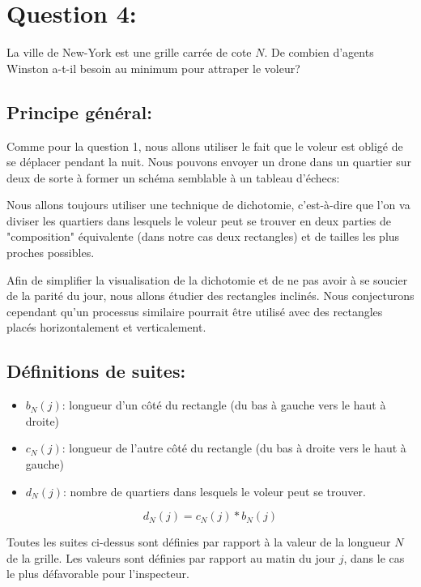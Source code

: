 \section{Question 4:}
\begin{enonce}
La ville de New-York est une grille carrée de cote $N$. De combien d'agents Winston a-t-il besoin au minimum pour attraper le voleur?
\end{enonce}
\subsection{Principe général:}
Comme pour la question 1, nous allons utiliser le fait que le voleur est obligé de se déplacer pendant la nuit. Nous pouvons envoyer un drone dans un quartier sur deux de sorte à former un schéma semblable à un tableau d'échecs:

\medskip

Nous allons toujours utiliser une technique de dichotomie, c'est-à-dire que l'on va diviser les quartiers dans lesquels le voleur peut se trouver en deux parties de "composition" équivalente (dans notre cas deux rectangles) et de tailles les plus proches possibles.

\medskip

Afin de simplifier la visualisation de la dichotomie et de ne pas avoir à se soucier de la parité du jour, nous allons étudier des rectangles inclinés. Nous conjecturons cependant qu'un processus similaire pourrait être utilisé avec des rectangles placés horizontalement et verticalement.

\subsection{Définitions de suites:}
\begin{itemize}
    \item $b_N(j)$: longueur d'un côté du rectangle (du bas à gauche vers le haut à droite)
    \item $c_N(j)$: longueur de l'autre côté du rectangle (du bas à droite vers le haut à gauche)
    \item $d_N(j)$: nombre de quartiers dans lesquels le voleur peut se trouver. 

\end{itemize}

$$d_N(j)=c_N(j)*b_N(j)$$

Toutes les suites ci-dessus sont définies par rapport à la valeur de la longueur $N$ de la grille. Les valeurs sont définies par rapport au matin du jour $j$, dans le cas le plus défavorable pour l'inspecteur.

